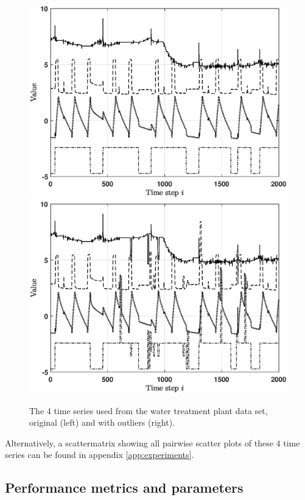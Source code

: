 \begin{figure}[h]
	\centering
	\includegraphics[scale=0.36]{experiments/Experiments_swat_timeseries}
	\includegraphics[scale=0.36]{experiments/Experiments_swat_timeseries_outliers}
	\caption{The $4$ time series used from the water treatment plant data set, original (left) and with outliers (right).}
	\vspace{0.2cm}
	\label{fig:experiments_swat}
\end{figure}

Alternatively, a scattermatrix showing all pairwise scatter plots of these $4$ time series can be found in appendix \ref{app:experiments}.

\subsection{Performance metrics and parameters}


